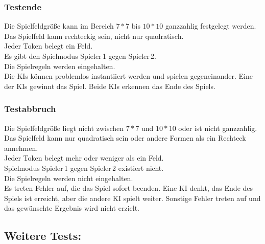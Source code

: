 \documentclass[a4paper, 12pt]{article}
\begin{document}
	\subsubsection{Testende}
	Die Spielfeldgröße kann im Bereich $7*7$ bis $10*10$ ganzzahlig festgelegt werden.\\
	Das Spielfeld kann rechteckig sein, nicht nur quadratisch.\\
	Jeder Token belegt ein Feld.\\
	Es gibt den Spielmodus Spieler\,1 gegen Spieler\,2.\\
	Die Spielregeln werden eingehalten.\\
	Die KIs können problemlos instantiiert werden und spielen gegeneinander. Eine der
	KIs gewinnt das Spiel. Beide KIs erkennen das Ende des Spiels.
	
	\subsubsection{Testabbruch}
	Die Spielfeldgröße liegt nicht zwischen $7*7$ und $10*10$ oder ist nicht ganzzahlig.\\
	Das Spielfeld kann nur quadratisch sein oder andere Formen als ein Rechteck annehmen.\\
	Jeder Token belegt mehr oder weniger als ein Feld.\\
	Spielmodus Spieler\,1 gegen Spieler\,2 existiert nicht.\\
	Die Spielregeln werden nicht eingehalten.\\		
	Es treten Fehler auf, die das Spiel sofort beenden. Eine KI denkt, das Ende des Spiels
	ist erreicht, aber die andere KI spielt weiter. Sonstige Fehler treten auf und das
	gewünschte Ergebnis wird nicht erzielt.
	
	\subsection{Weitere Tests: }
	
\end{document}
